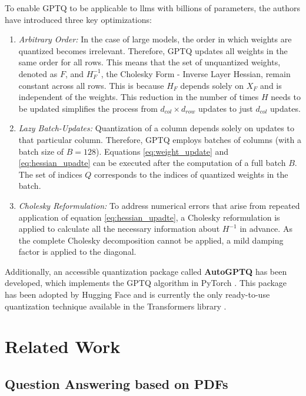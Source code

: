 To enable GPTQ to be applicable to \gls{llm}s with billions of parameters, the authors have introduced three key optimizations:

\begin{enumerate}
    \item \textit{Arbitrary Order:} In the case of large models, the order in which weights are quantized becomes irrelevant. Therefore, GPTQ updates all weights in the same order for all rows. This means that the set of unquantized weights, denoted as $F$, and $H_F^{-1}$, the Cholesky Form - Inverse Layer Hessian, remain constant across all rows. This is because $H_F$ depends solely on $X_F$ and is independent of the weights. This reduction in the number of times $H$ needs to be updated simplifies the process from $d_{col} \times d_{row}$ updates to just $d_{col}$ updates.
    \item \textit{Lazy Batch-Updates:} Quantization of a column depends solely on updates to that particular column. Therefore, GPTQ employs batches of columns (with a batch size of $B = 128$). Equations \ref{eq:weight_update} and \ref{eq:hessian_upadte} can be executed after the computation of a full batch $B$. The set of indices $Q$ corresponds to the indices of quantized weights in the batch.
    \item \textit{Cholesky Reformulation:} To address numerical errors that arise from repeated application of equation \ref{eq:hessian_upadte}, a Cholesky reformulation is applied to calculate all the necessary information about $H^{-1}$ in advance. As the complete Cholesky decomposition cannot be applied, a mild damping factor is applied to the diagonal.
\end{enumerate}

Additionally, an accessible quantization package called \textbf{AutoGPTQ} has been developed, which implements the GPTQ algorithm in PyTorch \cite{william_autogptq_2023}. This package has been adopted by Hugging Face and is currently the only ready-to-use quantization technique available in the Transformers library \cite{noauthor_quantize_nodate}.

\section{Related Work}
\label{sec:related_work}

\subsection{Question Answering based on PDFs}
\label{subsec:related_work_dbqa}

